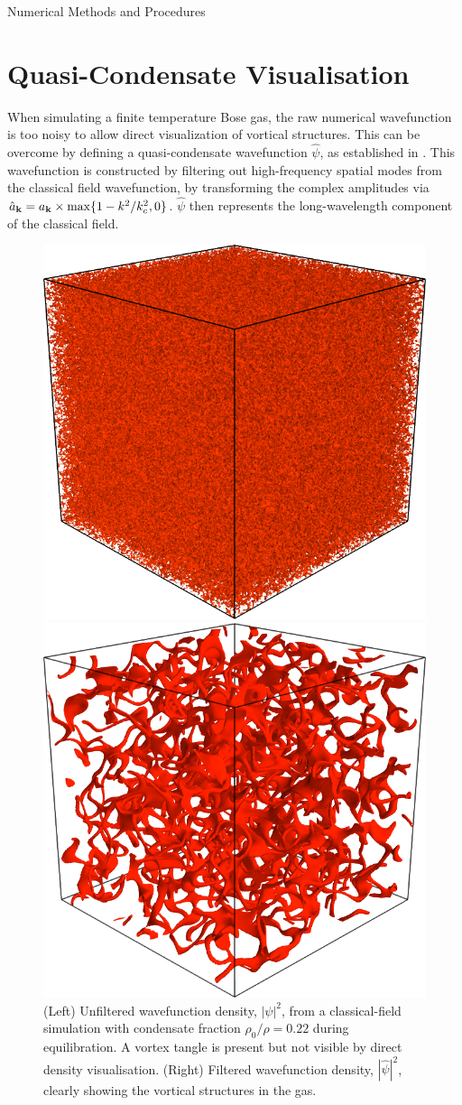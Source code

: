 \begin{chapter}{\label{cha:numerics}Numerical Methods and Procedures}
\section{\label{section:quasi-condensate} Quasi-Condensate Visualisation}
When simulating a finite temperature Bose gas, the raw numerical wavefunction is too noisy to allow direct visualization of vortical structures. This can be overcome by defining a quasi-condensate wavefunction $\hat{\psi}$, as established in \cite{PhysRevA.66.013603}. This wavefunction is constructed by filtering out high-frequency spatial modes from the classical field wavefunction, by 
transforming the complex amplitudes via
$\hat{a}_{{\bf k}} = a_{{\bf k}}\times\max\{1-k^{2}/k_c^2,0\}$. $\hat{\psi}$ then represents the long-wavelength component of the classical field.
\begin{figure}[!ht]
\centering
\includegraphics[width=0.35\linewidth]{numerics/figures/mess3d}%
    \begin{minipage}[b]{0.2\linewidth}
      \centering
      \raisebox{3cm}{$\longrightarrow$}
    \end{minipage}%
    \includegraphics[width=0.35\linewidth]{numerics/figures/clean3d}
  \caption{(Left) Unfiltered wavefunction density, $|\psi|^2$, from a classical-field simulation with condensate fraction $\rho_0/\rho=0.22$ during equilibration. A vortex tangle is present but not visible by direct density visualisation. (Right) Filtered wavefunction density, $|\hat{\psi}|^2$, clearly showing the vortical structures in the gas.}\label{fig:quasicondensatefilter}
  \end{figure}


\end{chapter}
